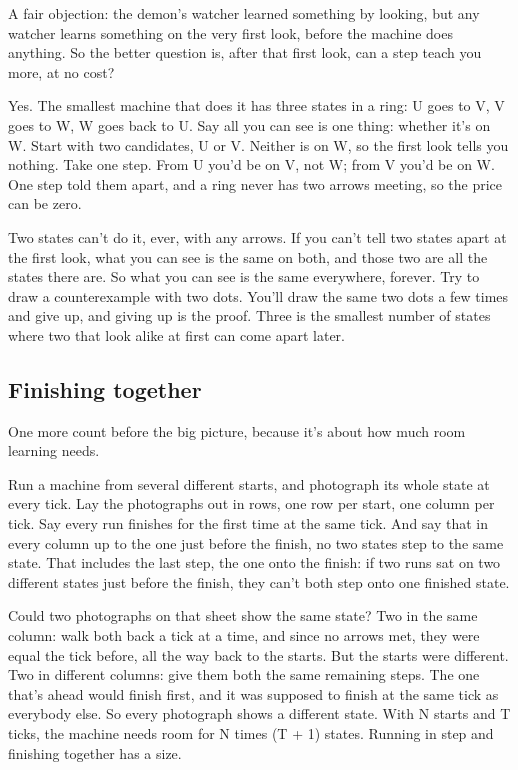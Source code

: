 \documentclass[11pt,twoside]{article}
\theoremstyle{thielethm}
\theoremstyle{thieledef}
\theoremstyle{thieledef}
\theoremstyle{thieledef}
\theoremstyle{thielethm}
\theoremstyle{thieleobs}
\theoremstyle{thielethm}
\begin{document}
A fair objection: the demon's watcher learned something by looking, but any watcher learns something on the very first look, before the machine does anything. So the better question is, after that first look, can a step teach you more, at no cost?

Yes. The smallest machine that does it has three states in a ring: U goes to V, V goes to W, W goes back to U. Say all you can see is one thing: whether it's on W. Start with two candidates, U or V. Neither is on W, so the first look tells you nothing. Take one step. From U you'd be on V, not W; from V you'd be on W. One step told them apart, and a ring never has two arrows meeting, so the price can be zero.

Two states can't do it, ever, with any arrows. If you can't tell two states apart at the first look, what you can see is the same on both, and those two are all the states there are. So what you can see is the same everywhere, forever. Try to draw a counterexample with two dots. You'll draw the same two dots a few times and give up, and giving up is the proof. Three is the smallest number of states where two that look alike at first can come apart later.

\subsection{Finishing together}

One more count before the big picture, because it's about how much room learning needs.

Run a machine from several different starts, and photograph its whole state at every tick. Lay the photographs out in rows, one row per start, one column per tick. Say every run finishes for the first time at the same tick. And say that in every column up to the one just before the finish, no two states step to the same state. That includes the last step, the one onto the finish: if two runs sat on two different states just before the finish, they can't both step onto one finished state.

Could two photographs on that sheet show the same state? Two in the same column: walk both back a tick at a time, and since no arrows met, they were equal the tick before, all the way back to the starts. But the starts were different. Two in different columns: give them both the same remaining steps. The one that's ahead would finish first, and it was supposed to finish at the same tick as everybody else. So every photograph shows a different state. With N starts and T ticks, the machine needs room for N times (T + 1) states. Running in step and finishing together has a size.
\end{document}
